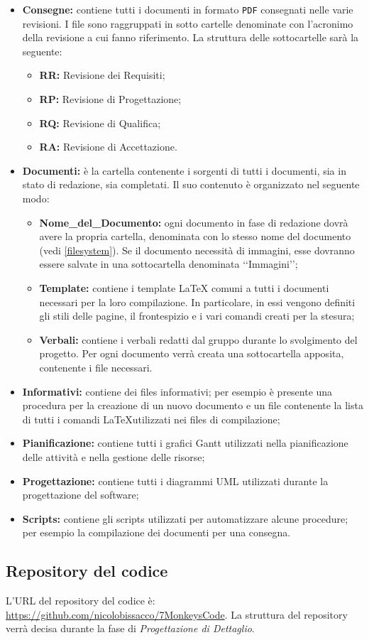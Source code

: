 \begin{itemize}
\item\textbf{Consegne:} contiene tutti i documenti in formato \verb!PDF!\glossario{} consegnati nelle varie revisioni. I file sono raggruppati in sotto cartelle denominate con l'acronimo della revisione a cui fanno riferimento. La struttura delle sottocartelle sarà la seguente:
\begin{itemize}
\item\textbf{RR:} Revisione dei Requisiti;
\item\textbf{RP:} Revisione di Progettazione;
\item\textbf{RQ:} Revisione di Qualifica;
\item\textbf{RA:} Revisione di Accettazione.
\end{itemize}

\item\textbf{Documenti:} è la cartella contenente i sorgenti di tutti i documenti, sia in stato di redazione, sia completati. Il suo contenuto è organizzato nel seguente modo:
\begin{itemize}
\item\textbf{Nome\_del\_Documento:} ogni documento in fase di redazione dovrà avere la propria cartella, denominata con lo stesso nome del documento (vedi \ref{filesystem}). Se il documento necessità di immagini, esse dovranno essere salvate in una sottocartella denominata \lq\lq{}Immagini\rq\rq{};
\item \textbf{Template:} contiene i template \LaTeX{} comuni a tutti i documenti necessari per la loro compilazione. In particolare, in essi vengono definiti gli stili delle pagine, il frontespizio e i vari comandi creati per la stesura;
\item \textbf{Verbali:} contiene i verbali redatti dal gruppo durante lo svolgimento del progetto. Per ogni documento verrà creata una sottocartella apposita, contenente i file necessari.
\end{itemize}

\item\textbf{Informativi:} contiene dei files informativi; per esempio è presente una procedura per la creazione di un nuovo documento e un file contenente la lista di tutti i comandi \LaTeX utilizzati nei files di compilazione;

\item\textbf{Pianificazione:} contiene tutti i grafici Gantt\glossario{} utilizzati nella pianificazione delle attività e nella gestione delle risorse;

\item\textbf{Progettazione:} contiene tutti i diagrammi UML\glossario{} utilizzati durante la progettazione del software;
\item\textbf{Scripts:} contiene gli scripts utilizzati per automatizzare alcune procedure; per esempio la compilazione dei documenti per una consegna.
\end{itemize}

\subsection{Repository del codice}
\label{repocodice}
L'URL del repository\glossario{} del codice è: \url{https://github.com/nicolobissacco/7MonkeysCode}.
La struttura del repository\glossario{} verrà decisa durante la fase di \emph{Progettazione di Dettaglio}.